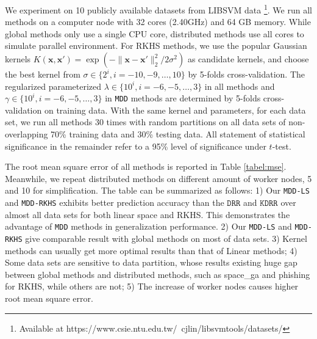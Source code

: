 \documentclass{article}
\begin{document}
We experiment on 10 publicly available datasets from LIBSVM data
\footnote{Available at https://www.csie.ntu.edu.tw/~cjlin/libsvmtools/datasets/}.
We run all methods on a computer node with 32 cores (2.40GHz) and 64 GB memory.
While global methods only use a single CPU core, distributed methods use all cores to simulate parallel environment.
For RKHS methods, we use the popular Gaussian kernels $K(\mathbf{x}, \mathbf{x}')=\exp(-{\|\mathbf{x}-\mathbf{x}'\|_2^2}/{2\sigma^2})$
as candidate kernels, and choose the best kernel from $\sigma \in \{2^i, i=-10, -9, \dots, 10\}$ by 5-folds cross-validation.
The regularized parameterized $\lambda \in \{10^i, i=-6,-5,\dots,3\}$ in all methods and $\gamma \in \{10^i, i=-6,-5,\dots,3\}$
in \texttt{MDD} methods are determined by 5-folds cross-validation on training data.
With the same kernel and parameters, for each data set,  we run all methods 30 times with random partitions on all data
sets of non-overlapping 70\% training data and 30\% testing data.
All statement of statistical significance in the remainder refer to a 95\% level of significance under $t$-test.

The root mean square error of all methods is reported in Table \ref{tabel:mse}. Meanwhile,
we repeat distributed methods on different amount of worker nodes, 5 and 10 for simplification.
The table can be summarized as follows:
1) Our \texttt{MDD-LS} and \texttt{MDD-RKHS} exhibits better prediction accuracy than the $\texttt{DRR}$ and $\texttt{KDRR}$
over almost all data sets for both linear space and RKHS.
This demonstrates the advantage of \texttt{MDD} methods in generalization performance.
2) Our \texttt{MDD-LS} and \texttt{MDD-RKHS} give comparable result with global methods on most of data sets.
3) Kernel methods can usually get more optimal results than that of Linear methods;
4) Some data sets are sensitive to data partition, whose results existing huge gap between global methods and distributed methods,
such as space\_ga and phishing for RKHS, while others are not;
5) The increase of worker nodes causes higher root mean square error.
\end{document}
